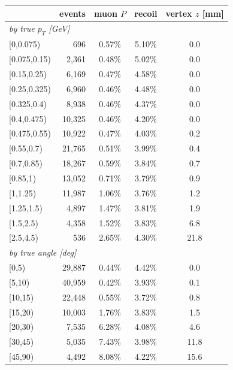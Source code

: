 \begin{tabular}{lrccc}
\toprule
 & events & muon $P$ & recoil & vertex $z$ [mm] \\
\midrule
\multicolumn{5}{l}{\emph{by true $p_T$ [GeV]}} \\
\quad [0{,}0.075) & 696 & 0.57\% & 5.10\% & 0.0 \\
\quad [0.075{,}0.15) & 2{,}361 & 0.48\% & 5.02\% & 0.0 \\
\quad [0.15{,}0.25) & 6{,}169 & 0.47\% & 4.58\% & 0.0 \\
\quad [0.25{,}0.325) & 6{,}960 & 0.46\% & 4.48\% & 0.0 \\
\quad [0.325{,}0.4) & 8{,}938 & 0.46\% & 4.37\% & 0.0 \\
\quad [0.4{,}0.475) & 10{,}325 & 0.46\% & 4.20\% & 0.0 \\
\quad [0.475{,}0.55) & 10{,}922 & 0.47\% & 4.03\% & 0.2 \\
\quad [0.55{,}0.7) & 21{,}765 & 0.51\% & 3.99\% & 0.4 \\
\quad [0.7{,}0.85) & 18{,}267 & 0.59\% & 3.84\% & 0.7 \\
\quad [0.85{,}1) & 13{,}052 & 0.71\% & 3.79\% & 0.9 \\
\quad [1{,}1.25) & 11{,}987 & 1.06\% & 3.76\% & 1.2 \\
\quad [1.25{,}1.5) & 4{,}897 & 1.47\% & 3.81\% & 1.9 \\
\quad [1.5{,}2.5) & 4{,}358 & 1.52\% & 3.83\% & 6.8 \\
\quad [2.5{,}4.5) & 536 & 2.65\% & 4.30\% & 21.8 \\
\multicolumn{5}{l}{\emph{by true angle [deg]}} \\
\quad [0{,}5) & 29{,}887 & 0.44\% & 4.42\% & 0.0 \\
\quad [5{,}10) & 40{,}959 & 0.42\% & 3.93\% & 0.1 \\
\quad [10{,}15) & 22{,}448 & 0.55\% & 3.72\% & 0.8 \\
\quad [15{,}20) & 10{,}003 & 1.76\% & 3.83\% & 1.5 \\
\quad [20{,}30) & 7{,}535 & 6.28\% & 4.08\% & 4.6 \\
\quad [30{,}45) & 5{,}035 & 7.43\% & 3.98\% & 11.8 \\
\quad [45{,}90) & 4{,}492 & 8.08\% & 4.22\% & 15.6 \\
\bottomrule
\end{tabular}
